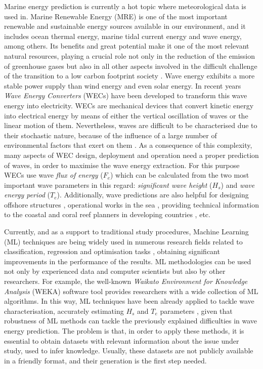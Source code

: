 \documentclass[review]{elsarticle}
\begin{document}
		Marine energy prediction is currently a hot topic where meteorological data is used in. Marine Renewable Energy (MRE) is one of the most important renewable and sustainable energy sources available in our environment, and it includes ocean thermal energy, marine tidal current energy and wave energy, among others. Its benefits and great potential \cite{ZEYRINGER20181281} make it one of the most relevant natural resources, playing a crucial role not only in the reduction of the emission of greenhouse gases but also in all other aspects involved in the difficult challenge of the transition to a low carbon footprint society \cite{BHATTACHARYA2017157, BREDE201344}. Wave energy exhibits a more stable power supply than wind energy and even solar energy. In recent years \textit{Wave Energy Converters} (WECs) \cite{FALCAO2010899} have been developed to transform this wave energy into electricity. WECs are mechanical devices that convert kinetic energy into electrical energy by means of either the vertical oscillation of waves or the linear motion of them. Nevertheless, waves are difficult to be characterised due to their stochastic nature, because of the influence of a large number of environmental factors that exert on them \cite{ochi1998}. As a consequence of this complexity, many aspects of WEC design, deployment and operation \cite{CROWLEY2018159, Abdelkhalik2016, 6898109} need a proper prediction of waves, in order to maximise the wave energy extraction. For this purpose WECs use wave \textit{flux of energy} ($F_e$) which can be calculated from the two most important wave parameters in this regard: \textit{significant wave height} ($H_s$) and \textit{wave energy period} ($T_e$). Additionally, wave predictions are also helpful for designing offshore structures \cite{CHATZIIOANNOU2017126}, operational works in the sea \cite{DALGIC2015211}, providing technical information to the coastal and coral reef planners in developing countries \cite{CALLAGHAN2018123}, etc.

		Currently, and as a support to traditional study procedures, Machine Learning (ML) techniques \cite{Alpaydin:2004:IML:1036287,Bishop:2006:PRM:1162264} are being widely used in numerous research fields related to classification, regression and optimisation tasks \cite{srivastava2017large}, obtaining significant improvements in the performance of the results. ML methodologies can be used not only by experienced data and computer scientists but also by other researchers. For example, the well-known \textit{Waikato Environment for Knowledge Analysis} (WEKA) \cite{WEKA} software tool provides researchers with a wide collection of ML algorithms. In this way, ML techniques have been already applied to tackle wave characterisation, accurately estimating $H_{s}$ and $T_{e}$ parameters \cite{DURANROSAL2017268, KUMAR2017605}, given that robustness of ML methods can tackle the previously explained difficulties in wave energy prediction. The problem is that, in order to apply these methods, it is essential to obtain datasets with relevant information about the issue under study, used to infer knowledge. Usually, these datasets are not publicly available in a friendly format, and their generation is the first step needed.
\end{document}
